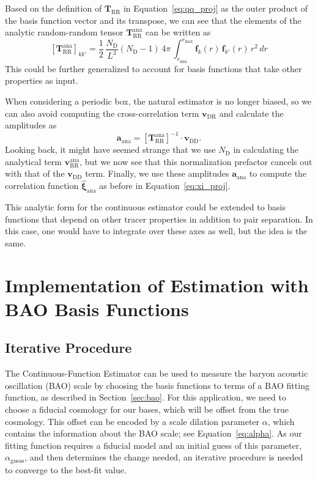 \documentclass[modern]{aastex62}
\newcommand{\Est}{The Continuous-Function Estimator\xspace}
\newcommand{\inv}{^{-1}}
\newcommand{\bld}[1]{\bm{#1}} %
\newcommand{\vv}[1]{\bld{v}_\mathrm{#1}}
\newcommand{\TT}[1]{\bld{T}_\mathrm{#1}}
\newcommand{\ff}{\bld{f}}
\newcommand{\NN}[1]{N_\mathrm{#1}}
\begin{document}
Based on the definition of $\TT{RR}$ in Equation~\ref{eq:qq_proj} as the outer product of the basis function vector and its transpose, we can see that the elements of the analytic random-random tensor $\TT{RR}^\mathrm{ana}$ can be written as
\begin{equation}
\left[ \TT{RR}^\mathrm{ana} \right]_{kk'} = \frac{1}{2} \, \frac{\NN{D}}{L^3} (\NN{D}-1) \, 4\pi \, \int_{r_\mathrm{min}}^{r_\mathrm{max}} \ff_k(r) \, \ff_{k'}(r) \, r^2 \, dr
\end{equation}
This could be further generalized to account for basis functions that take other properties as input.

When considering a periodic box, the natural estimator is no longer biased, so we can also avoid computing the cross-correlation term $\vv{DR}$ and calculate the amplitudes as 
\begin{equation}
\bld{a}_{\mathrm{ana}} = \left[ \TT{RR}^\mathrm{ana} \right]\inv \cdot \vv{DD}.
\end{equation}
Looking back, it might have seemed strange that we use $\NN{D}$ in calculating the analytical term $\vv{RR}^\mathrm{ana}$, but we now see that this normalization prefactor cancels out with that of the $\vv{DD}$ term.
Finally, we use these amplitudes $\bld{a}_{\mathrm{ana}}$ to compute the correlation function $\bld{\hat{\xi}}_{\mathrm{ana}}$ as before in Equation~\ref{eq:xi_proj}.

This analytic form for the continuous estimator could be extended to basis functions that depend on other tracer properties in addition to pair separation.
In this case, one would have to integrate over these axes as well, but the idea is the same.

\section{Implementation of Estimation with BAO Basis Functions}\label{sec:baoiter}

\subsection{Iterative Procedure}
\Est can be used to measure the baryon acoustic oscillation (BAO) scale by choosing the basis functions to terms of a BAO fitting function, as described in Section~\ref{sec:bao}.
For this application, we need to choose a fiducial cosmology for our bases, which will be offset from the true cosmology.
This offset can be encoded by a scale dilation parameter $\alpha$, which contains the information about the BAO scale; see Equation~\ref{eq:alpha}. 
As our fitting function requires a fiducial model and an initial guess of this parameter, $\alpha_\mathrm{guess}$, and then determines the change needed, an iterative procedure is needed to converge to the best-fit value.
\end{document}
